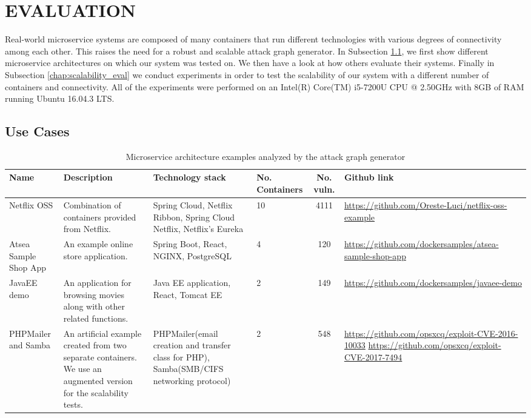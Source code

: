 
\section{EVALUATION}
\label{chap:eval}

Real-world microservice systems are composed of many containers that run different technologies with various degrees of connectivity among each other. This raises the need for a robust and scalable attack graph generator. In Subsection \ref{chap:heterogenious_systems}, we first show different microservice architectures on which our system was tested on. We then have a look at how others evaluate their systems. Finally in Subsection \ref{chap:scalability_eval} we conduct experiments in order to test the scalability of our system with a different number of containers and connectivity. All of the experiments were performed on an Intel(R) Core(TM) i5-7200U CPU @ 2.50GHz with 8GB of RAM running Ubuntu 16.04.3 LTS.

\subsection{Use Cases}
\label{chap:heterogenious_systems}
\begin{table*}[t]
	\begin{center}
		\begin{tabular}{ p{20mm}p{35mm}p{35mm}p{10mm}cp{35mm} } 
			\hline
			Name & Description & Technology stack & No. Containers & No. vuln. & Github link \\\hline 
			
			Netflix OSS & Combination of containers provided from Netflix. & Spring Cloud, Netflix Ribbon, Spring Cloud Netflix, Netflix's Eureka & 10 & 4111 & \url{https://github.com/Oreste-Luci/netflix-oss-example} \\
			
			Atsea Sample Shop App & An example online store application. & Spring Boot, React, NGINX, PostgreSQL & 4 & 120 & \url{https://github.com/dockersamples/atsea-sample-shop-app} \\
			
			JavaEE demo & An application for browsing movies along with other related functions. & Java EE application, React, Tomcat EE & 2 & 149 & \url{https://github.com/dockersamples/javaee-demo} \\
			
			PHPMailer and Samba & An artificial example created from two separate containers. We use an augmented version for the scalability tests. & PHPMailer(email creation and transfer class for PHP), Samba(SMB/CIFS networking protocol) & 2 & 548 &  \url{https://github.com/opsxcq/exploit-CVE-2016-10033}
			\url{https://github.com/opsxcq/exploit-CVE-2017-7494} \\
			
			
			\hline
		\end{tabular}
	\end{center}
	
	\caption{Microservice architecture examples analyzed by the attack graph generator}
	\label{table_technologies}
	
\end{table*}

